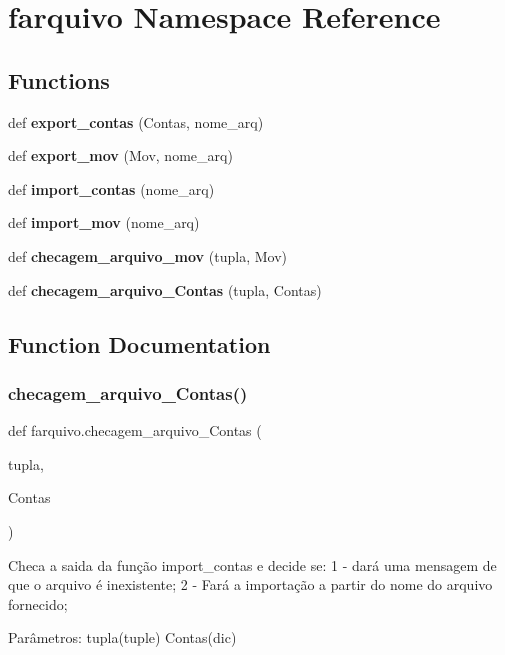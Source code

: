 \section{farquivo Namespace Reference}
\label{namespacefarquivo}
\subsection*{Functions}
\begin{DoxyCompactItemize}
\item 
def \textbf{ export\+\_\+contas} (Contas, nome\+\_\+arq)
\item 
def \textbf{ export\+\_\+mov} (Mov, nome\+\_\+arq)
\item 
def \textbf{ import\+\_\+contas} (nome\+\_\+arq)
\item 
def \textbf{ import\+\_\+mov} (nome\+\_\+arq)
\item 
def \textbf{ checagem\+\_\+arquivo\+\_\+mov} (tupla, Mov)
\item 
def \textbf{ checagem\+\_\+arquivo\+\_\+\+Contas} (tupla, Contas)
\end{DoxyCompactItemize}


\subsection{Function Documentation}
\mbox{\label{namespacefarquivo_a3515f184565fdfbcb614ddf80524450a}} 
\subsubsection{checagem\_arquivo\_Contas()}
{\footnotesize\ttfamily def farquivo.\+checagem\+\_\+arquivo\+\_\+\+Contas (\begin{DoxyParamCaption}\item[{}]{tupla,  }\item[{}]{Contas }\end{DoxyParamCaption})}

\begin{DoxyVerb}Checa a saida da função import_contas e decide se:
1 - dará uma mensagem de que o arquivo é inexistente;
2 - Fará a importação a partir do nome do arquivo fornecido;

Parâmetros:
tupla(tuple)
Contas(dic)
\end{DoxyVerb}
 

